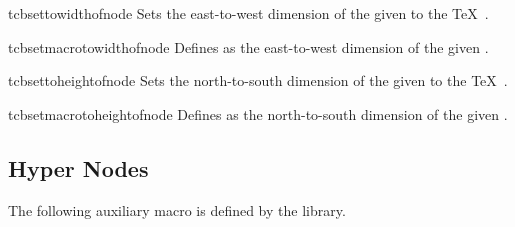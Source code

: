 \begin{docCommand}[doc new=2014-09-19]{tcbsettowidthofnode}{}
  Sets the east-to-west dimension of the given 
  to the \TeX\ .
\end{docCommand}

\begin{docCommand}[doc new=2014-09-19]{tcbsetmacrotowidthofnode}{}
  Defines  as the east-to-west dimension of the given .
\end{docCommand}

\begin{docCommand}[doc new=2014-09-19]{tcbsettoheightofnode}{}
  Sets the north-to-south dimension of the given 
  to the \TeX\ .
\end{docCommand}

\begin{docCommand}[doc new=2014-09-19]{tcbsetmacrotoheightofnode}{}
  Defines  as the north-to-south dimension of the given .
\end{docCommand}

\begin{dispExample}
\end{dispExample}


\subsection{Hyper Nodes}
The following auxiliary macro is defined by the  library.
\enlargethispage*{1cm}

